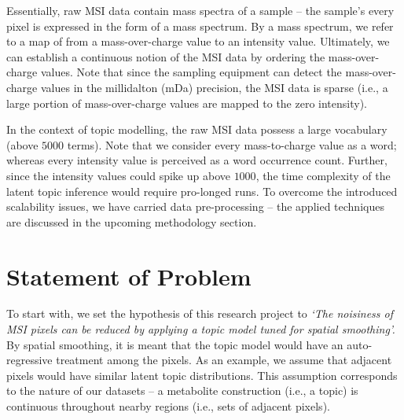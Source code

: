 \documentclass{mpaper}
\begin{document}
\par Essentially, raw MSI data contain mass spectra of a sample -- the sample's every pixel is expressed in the form of a mass spectrum. By a mass spectrum, we refer to a map of from a mass-over-charge value to an intensity value. Ultimately, we can establish a continuous notion of the MSI data by ordering the mass-over-charge values. Note that since the sampling equipment can detect the mass-over-charge values in the millidalton (mDa) precision, the MSI data is sparse (i.e., a large portion of mass-over-charge values are mapped to the zero intensity).

\par In the context of topic modelling, the raw MSI data possess a large vocabulary (above $5000$ terms). Note that we consider every mass-to-charge value as a word; whereas every intensity value is perceived as a word occurrence count. Further, since the intensity values could spike up above $1000$, the time complexity of the latent topic inference would require pro-longed runs. To overcome the introduced scalability issues, we have carried data pre-processing -- the applied techniques are discussed in the upcoming methodology section.

\section{Statement of Problem}

\par To start with, we set the hypothesis of this research project to \textit{`The noisiness of MSI pixels can be reduced by applying a topic model tuned for spatial smoothing'.} By spatial smoothing, it is meant that the topic model would have an auto-regressive treatment among the pixels. As an example, we assume that adjacent pixels would have similar latent topic distributions. This assumption corresponds to the nature of our datasets -- a metabolite construction (i.e., a topic) is continuous throughout nearby regions (i.e., sets of adjacent pixels).
\end{document}
